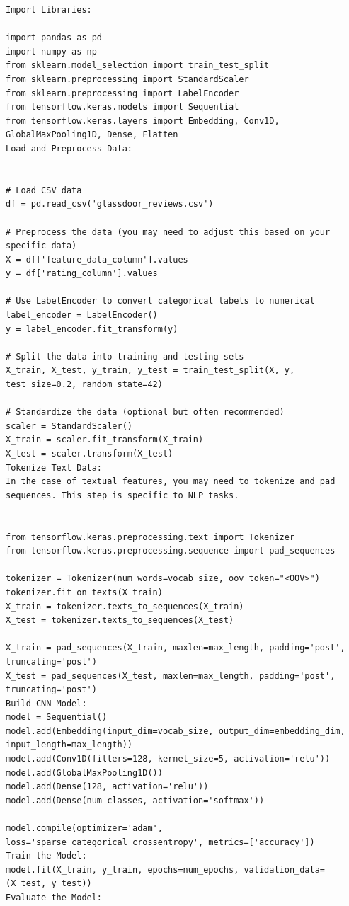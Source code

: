 \documentclass{article}
\begin{document}
\begin{titlepage}
\begin{verbatim}
Import Libraries:

import pandas as pd
import numpy as np
from sklearn.model_selection import train_test_split
from sklearn.preprocessing import StandardScaler
from sklearn.preprocessing import LabelEncoder
from tensorflow.keras.models import Sequential
from tensorflow.keras.layers import Embedding, Conv1D, GlobalMaxPooling1D, Dense, Flatten
Load and Preprocess Data:


# Load CSV data
df = pd.read_csv('glassdoor_reviews.csv')

# Preprocess the data (you may need to adjust this based on your specific data)
X = df['feature_data_column'].values
y = df['rating_column'].values

# Use LabelEncoder to convert categorical labels to numerical
label_encoder = LabelEncoder()
y = label_encoder.fit_transform(y)

# Split the data into training and testing sets
X_train, X_test, y_train, y_test = train_test_split(X, y, test_size=0.2, random_state=42)

# Standardize the data (optional but often recommended)
scaler = StandardScaler()
X_train = scaler.fit_transform(X_train)
X_test = scaler.transform(X_test)
Tokenize Text Data:
In the case of textual features, you may need to tokenize and pad sequences. This step is specific to NLP tasks.


from tensorflow.keras.preprocessing.text import Tokenizer
from tensorflow.keras.preprocessing.sequence import pad_sequences

tokenizer = Tokenizer(num_words=vocab_size, oov_token="<OOV>")
tokenizer.fit_on_texts(X_train)
X_train = tokenizer.texts_to_sequences(X_train)
X_test = tokenizer.texts_to_sequences(X_test)

X_train = pad_sequences(X_train, maxlen=max_length, padding='post', truncating='post')
X_test = pad_sequences(X_test, maxlen=max_length, padding='post', truncating='post')
Build CNN Model:
model = Sequential()
model.add(Embedding(input_dim=vocab_size, output_dim=embedding_dim, input_length=max_length))
model.add(Conv1D(filters=128, kernel_size=5, activation='relu'))
model.add(GlobalMaxPooling1D())
model.add(Dense(128, activation='relu'))
model.add(Dense(num_classes, activation='softmax'))

model.compile(optimizer='adam', loss='sparse_categorical_crossentropy', metrics=['accuracy'])
Train the Model:
model.fit(X_train, y_train, epochs=num_epochs, validation_data=(X_test, y_test))
Evaluate the Model:


\end{verbatim}
\end{titlepage}
\end{document}

